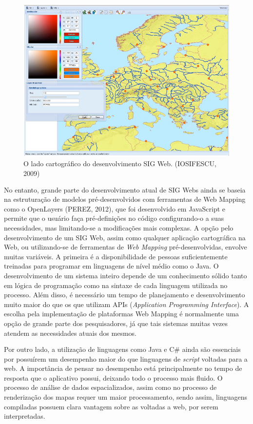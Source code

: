		\begin{figure}
			\centering
			\includegraphics[width=1\linewidth]{data/sigweb_cartografico_side}
			\caption{O lado cartográfico do desenvolvimento SIG Web. (IOSIFESCU, 2009)}
			\label{fig:sigwebcartograficoside}
		\end{figure}
		
		No entanto, grande parte do desenvolvimento atual de SIG Webs ainda se baseia na estruturação de modelos pré-desenvolvidos com ferramentas de Web Mapping como o OpenLayers (PEREZ, 2012)\cite{PEREZ}, que foi desenvolvido em JavaScript e permite que o usuário faça pré-definições no código configurando-o a suas necessidades, mas limitando-se a modificações mais complexas. A opção pelo desenvolvimento de um SIG Web, assim como qualquer aplicação cartográfica na Web, ou utilizando-se de ferramentas de \textit{Web Mapping} pré-desenvolvidas, envolve muitas variáveis. A primeira é a disponibilidade de pessoas suficientemente treinadas para programar em linguagens de nível médio como o Java. O desenvolvimento de um sistema inteiro depende de um conhecimento sólido tanto em lógica de programação como na sintaxe de cada linguagem utilizada no processo. Além disso, é necessário um tempo de planejamento e desenvolvimento muito maior do que os que utilizam APIs (\textit{Application Programming Interface}). A escolha pela implementação de plataformas Web Mapping é normalmente uma opção de grande parte dos pesquisadores, já que tais sistemas muitas vezes atendem as necessidades atuais dos mesmos. 
		
		Por outro lado, a utilização de linguagens como Java e C\# ainda são essenciais por possuírem um desempenho maior do que linguagens de \textit{script} voltadas para a web. A importância de pensar no desempenho está principalmente no tempo de resposta que o aplicativo possui, deixando todo o processo mais fluido. O processo de análise de dados espacializados, assim como no processo de renderização dos mapas requer um maior processamento, sendo assim, linguagens compiladas possuem clara vantagem sobre as voltadas a web, por serem interpretadas.
		
